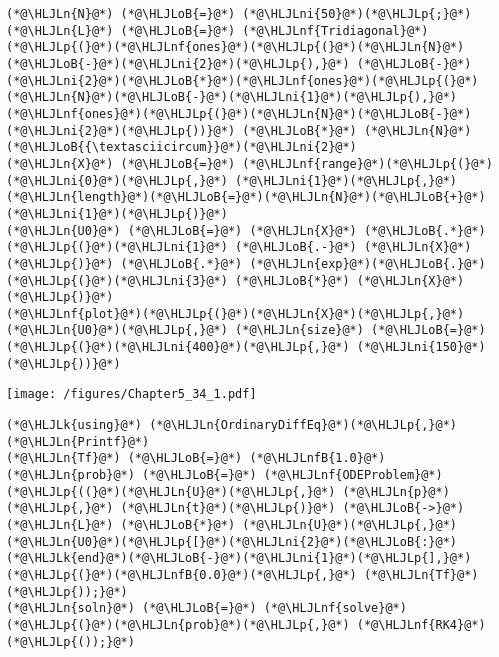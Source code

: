 \documentclass[12pt,a4paper]{article}
\newcommand{\HLJLk}[1]{\textcolor[RGB]{148,91,176}{\textbf{#1}}}
\newcommand{\HLJLn}[1]{#1}
\newcommand{\HLJLnf}[1]{\textcolor[RGB]{66,102,213}{#1}}
\newcommand{\HLJLnfB}[1]{\textcolor[RGB]{59,151,46}{#1}}
\newcommand{\HLJLni}[1]{\textcolor[RGB]{59,151,46}{#1}}
\newcommand{\HLJLoB}[1]{\textcolor[RGB]{102,102,102}{\textbf{#1}}}
\newcommand{\HLJLp}[1]{#1}
\begin{document}
\begin{lstlisting}
(*@\HLJLn{N}@*) (*@\HLJLoB{=}@*) (*@\HLJLni{50}@*)(*@\HLJLp{;}@*) 
(*@\HLJLn{L}@*) (*@\HLJLoB{=}@*) (*@\HLJLnf{Tridiagonal}@*)(*@\HLJLp{(}@*)(*@\HLJLnf{ones}@*)(*@\HLJLp{(}@*)(*@\HLJLn{N}@*)(*@\HLJLoB{-}@*)(*@\HLJLni{2}@*)(*@\HLJLp{),}@*) (*@\HLJLoB{-}@*)(*@\HLJLni{2}@*)(*@\HLJLoB{*}@*)(*@\HLJLnf{ones}@*)(*@\HLJLp{(}@*)(*@\HLJLn{N}@*)(*@\HLJLoB{-}@*)(*@\HLJLni{1}@*)(*@\HLJLp{),}@*) (*@\HLJLnf{ones}@*)(*@\HLJLp{(}@*)(*@\HLJLn{N}@*)(*@\HLJLoB{-}@*)(*@\HLJLni{2}@*)(*@\HLJLp{))}@*) (*@\HLJLoB{*}@*) (*@\HLJLn{N}@*)(*@\HLJLoB{{\textasciicircum}}@*)(*@\HLJLni{2}@*)
(*@\HLJLn{X}@*) (*@\HLJLoB{=}@*) (*@\HLJLnf{range}@*)(*@\HLJLp{(}@*)(*@\HLJLni{0}@*)(*@\HLJLp{,}@*) (*@\HLJLni{1}@*)(*@\HLJLp{,}@*) (*@\HLJLn{length}@*)(*@\HLJLoB{=}@*)(*@\HLJLn{N}@*)(*@\HLJLoB{+}@*)(*@\HLJLni{1}@*)(*@\HLJLp{)}@*)
(*@\HLJLn{U0}@*) (*@\HLJLoB{=}@*) (*@\HLJLn{X}@*) (*@\HLJLoB{.*}@*) (*@\HLJLp{(}@*)(*@\HLJLni{1}@*) (*@\HLJLoB{.-}@*) (*@\HLJLn{X}@*)(*@\HLJLp{)}@*) (*@\HLJLoB{.*}@*) (*@\HLJLn{exp}@*)(*@\HLJLoB{.}@*)(*@\HLJLp{(}@*)(*@\HLJLni{3}@*) (*@\HLJLoB{*}@*) (*@\HLJLn{X}@*)(*@\HLJLp{)}@*)
(*@\HLJLnf{plot}@*)(*@\HLJLp{(}@*)(*@\HLJLn{X}@*)(*@\HLJLp{,}@*) (*@\HLJLn{U0}@*)(*@\HLJLp{,}@*) (*@\HLJLn{size}@*) (*@\HLJLoB{=}@*) (*@\HLJLp{(}@*)(*@\HLJLni{400}@*)(*@\HLJLp{,}@*) (*@\HLJLni{150}@*)(*@\HLJLp{))}@*)
\end{lstlisting}

\texttt{[image: /figures/Chapter5\_34\_1.pdf]}

\begin{lstlisting}
(*@\HLJLk{using}@*) (*@\HLJLn{OrdinaryDiffEq}@*)(*@\HLJLp{,}@*) (*@\HLJLn{Printf}@*)
(*@\HLJLn{Tf}@*) (*@\HLJLoB{=}@*) (*@\HLJLnfB{1.0}@*)
(*@\HLJLn{prob}@*) (*@\HLJLoB{=}@*) (*@\HLJLnf{ODEProblem}@*)(*@\HLJLp{((}@*)(*@\HLJLn{U}@*)(*@\HLJLp{,}@*) (*@\HLJLn{p}@*)(*@\HLJLp{,}@*) (*@\HLJLn{t}@*)(*@\HLJLp{)}@*) (*@\HLJLoB{->}@*) (*@\HLJLn{L}@*) (*@\HLJLoB{*}@*) (*@\HLJLn{U}@*)(*@\HLJLp{,}@*) (*@\HLJLn{U0}@*)(*@\HLJLp{[}@*)(*@\HLJLni{2}@*)(*@\HLJLoB{:}@*)(*@\HLJLk{end}@*)(*@\HLJLoB{-}@*)(*@\HLJLni{1}@*)(*@\HLJLp{],}@*) (*@\HLJLp{(}@*)(*@\HLJLnfB{0.0}@*)(*@\HLJLp{,}@*) (*@\HLJLn{Tf}@*)(*@\HLJLp{));}@*)
(*@\HLJLn{soln}@*) (*@\HLJLoB{=}@*) (*@\HLJLnf{solve}@*)(*@\HLJLp{(}@*)(*@\HLJLn{prob}@*)(*@\HLJLp{,}@*) (*@\HLJLnf{RK4}@*)(*@\HLJLp{());}@*)
\end{lstlisting}
\end{document}
